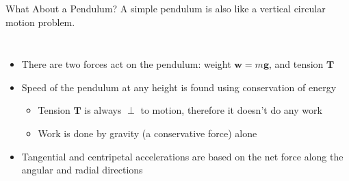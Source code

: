 \documentclass[12pt,compress,aspectratio=169]{beamer}
\begin{document}
\begin{frame}{What About a Pendulum?}
  A simple pendulum is also like a vertical circular motion problem.

  \vspace{.1in}\begin{columns}

    \begin{itemize}
    \item There are two forces act on the pendulum: weight $\bm{w}=m\bm{g}$, and
    tension $\bm{T}$
    \item Speed of the pendulum at any height is found using conservation
      of energy
      \begin{itemize}
      \item Tension $\bm{T}$ is always $\perp$ to motion, therefore it doesn't
        do any work
      \item Work is done by gravity (a conservative force) alone
      \end{itemize}
    \item Tangential and centripetal accelerations are based on the net force
      along the angular and radial directions
    \end{itemize}
  \end{columns}
\end{frame}
\end{document}
